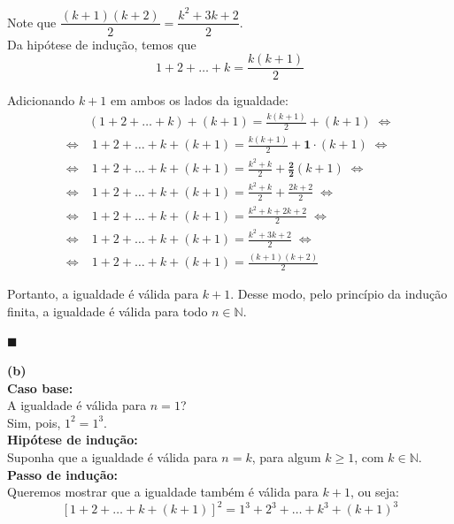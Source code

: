 \documentclass[12pt, a4paper]{article}
\begin{document}
Note que \(\dfrac{(k+1)(k+2)}{2} = \dfrac{k^2 + 3k + 2}{2}\). \\

Da hipótese de indução, temos que \[1+2+\ldots + k = \dfrac{k(k+1)}{2}\]

Adicionando \(k+1\) em ambos os lados da igualdade: 
\begin{align}
&(1+2+\ldots + k)+(k+1)  = \frac{k(k+1)}{2}+(k+1) \; \Longleftrightarrow \\
\Longleftrightarrow & \; 1+2+\ldots + k + (k+1) = \frac{k(k+1)}{2} + \mathbf{1}\cdot{(k+1)} \; \Longleftrightarrow  \\
\Longleftrightarrow & \; 1+2+\ldots + k + (k+1) = \frac{k^2+k}{2} + \mathbf{\frac{2}{2}}(k+1) \; \Longleftrightarrow  \\
\Longleftrightarrow & \; 1+2+\ldots + k + (k+1) = \frac{k^2+k}{2} + \frac{2k+2}{2} \; \Longleftrightarrow \\
\Longleftrightarrow & \; 1+2+\ldots + k + (k+1) = \frac{k^2 + k + 2k +2}{2} \; \Longleftrightarrow  \\
\Longleftrightarrow & \; 1+2+\ldots + k + (k+1) = \frac{k^2+3k+2}{2} \; \Longleftrightarrow \\ 
\Longleftrightarrow & \; 1+2+\ldots + k + (k+1) = \frac{(k+1)(k+2)}{2}
\end{align}

Portanto, a igualdade é válida para \(k+1\). Desse modo, pelo princípio da indução finita, a igualdade é válida para todo \(n \in \mathbb{N}\).

\begin{flushright}
$\blacksquare$
\end{flushright}

\textbf{(b)} \\


\textbf{Caso base:} \\

A igualdade é válida para \(n=1\)? \\

Sim, pois, \(1^2 = 1^3\).  \\

\textbf{Hipótese de indução:} \\

Suponha que a igualdade é válida para \(n=k\), para algum \(k \geq 1\), com \(k \in \mathbb{N}\). \\

\textbf{Passo de indução:} \\

Queremos mostrar que a igualdade também é válida para \(k+1\), ou seja: \[[1+2+\ldots + k + (k+1)]^2 = 1^3 + 2^3 + \ldots+k^3 + (k+1)^3\]
\end{document}
